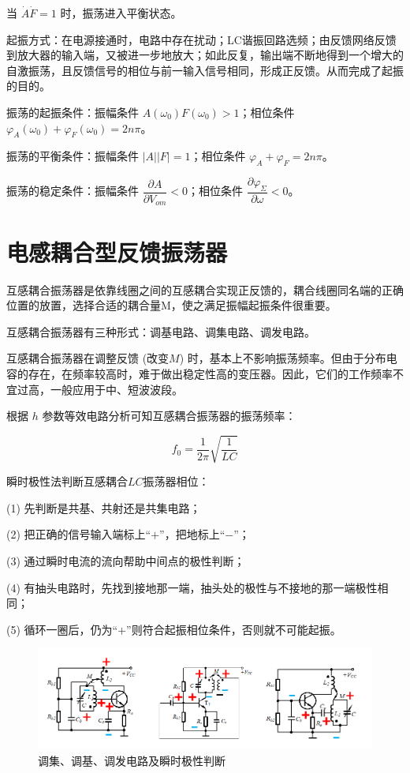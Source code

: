 当 $\dot{A} \dot{F} = 1$ 时，振荡进入平衡状态。

起振方式：在电源接通时，电路中存在扰动；LC谐振回路选频；由反馈网络反馈到放大器的输入端，又被进一步地放大；如此反复，输出端不断地得到一个增大的自激振荡，且反馈信号的相位与前一输入信号相同，形成正反馈。从而完成了起振的目的。

振荡的起振条件：振幅条件 $A(\omega_0) F(\omega_0) > 1$；相位条件 $\varphi_A(\omega_0) + \varphi_F(\omega_0) = 2 n \pi$。

振荡的平衡条件：振幅条件 $|A||F| = 1$；相位条件 $\varphi_A + \varphi_F = 2 n \pi$。

振荡的稳定条件：振幅条件 $\dfrac{\partial A}{\partial V_{om}} < 0$；相位条件 $\dfrac{\partial \varphi_{\Sigma}}{\partial \omega} < 0$。

\section{电感耦合型反馈振荡器}

互感耦合振荡器是依靠线圈之间的互感耦合实现正反馈的，耦合线圈同名端的正确位置的放置，选择合适的耦合量M，使之满足振幅起振条件很重要。

互感耦合振荡器有三种形式：调基电路、调集电路、调发电路。

互感耦合振荡器在调整反馈 (改变$M$) 时，基本上不影响振荡频率。但由于分布电容的存在，在频率较高时，难于做出稳定性高的变压器。因此，它们的工作频率不宜过高，一般应用于中、短波波段。

根据 $h$ 参数等效电路分析可知互感耦合振荡器的振荡频率：

\begin{equation}
    f_0 = \frac{1}{2 \pi} \sqrt{\frac{1}{LC}}
\end{equation}

瞬时极性法判断互感耦合$LC$振荡器相位：

(1) 先判断是共基、共射还是共集电路；

(2) 把正确的信号输入端标上“$+$”，把地标上“$-$”；

(3) 通过瞬时电流的流向帮助中间点的极性判断；

(4) 有抽头电路时，先找到接地那一端，抽头处的极性与不接地的那一端极性相同；

(5) 循环一圈后，仍为“$+$”则符合起振相位条件，否则就不可能起振。

\begin{figure}
    \centering
    \includegraphics[scale=0.8]{image/Picture6.png}
    \caption{调集、调基、调发电路及瞬时极性判断}
\end{figure}

